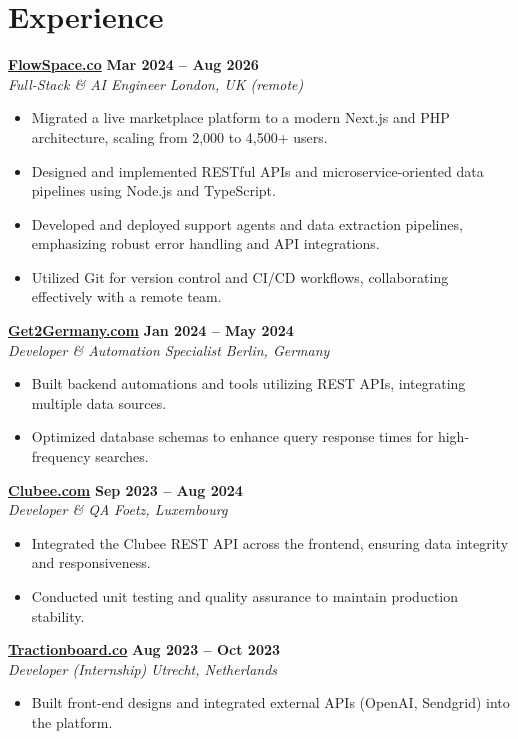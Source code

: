 \documentclass[a4paper,10pt]{article}
\newcommand{\role}[4]{%
 \textbf{#1} \hfill \textbf{#2}\\[1pt]%
 \textit{#3} \hfill \textit{#4}\\[2pt]%
}
\begin{document}
\section{Experience}

\role{\href{https://flowspace.co}{FlowSpace.co}}{Mar 2024 -- Aug 2026}{Full-Stack \& AI Engineer}{London, UK (remote)}
\begin{itemize}
 \item Migrated a live marketplace platform to a modern Next.js and PHP architecture, scaling from 2,000 to 4,500+ users.
 \item Designed and implemented RESTful APIs and microservice-oriented data pipelines using Node.js and TypeScript.
 \item Developed and deployed support agents and data extraction pipelines, emphasizing robust error handling and API integrations.
 \item Utilized Git for version control and CI/CD workflows, collaborating effectively with a remote team.
\end{itemize}

\role{\href{https://get2germany.com}{Get2Germany.com}}{Jan 2024 -- May 2024}{Developer \& Automation Specialist}{Berlin, Germany}
\begin{itemize}
 \item Built backend automations and tools utilizing REST APIs, integrating multiple data sources.
 \item Optimized database schemas to enhance query response times for high-frequency searches.
\end{itemize}

\role{\href{https://clubee.com}{Clubee.com}}{Sep 2023 -- Aug 2024}{Developer \& QA}{Foetz, Luxembourg}
\begin{itemize}
 \item Integrated the Clubee REST API across the frontend, ensuring data integrity and responsiveness.
 \item Conducted unit testing and quality assurance to maintain production stability.
\end{itemize}

\role{\href{https://tractionboard.co}{Tractionboard.co}}{Aug 2023 -- Oct 2023}{Developer (Internship)}{Utrecht, Netherlands}
\begin{itemize}
 \item Built front-end designs and integrated external APIs (OpenAI, Sendgrid) into the platform.
\end{itemize}
\end{document}
